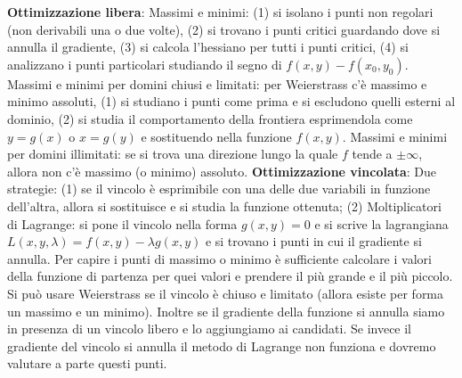 \documentclass[fontsize=8pt]{scrartcl}
\begin{document}
\begin{multicols*}{4}
\textbf{Ottimizzazione libera}:\newline
Massimi e minimi: (1) si isolano i punti non regolari (non derivabili una o due volte), (2) si trovano i punti critici guardando dove si annulla il gradiente, (3) si calcola l'hessiano per tutti i punti critici, (4) si analizzano i punti particolari studiando il segno di $f(x,y) - f(x_0, y_0)$.\newline
Massimi e minimi per domini chiusi e limitati: per Weierstrass c'è massimo e minimo assoluti, (1) si studiano i punti come prima e si escludono quelli esterni al dominio, (2) si studia il comportamento della frontiera esprimendola come $y = g(x)$ o $x = g(y)$ e sostituendo nella funzione $f(x,y)$.\newline
Massimi e minimi per domini illimitati: se si trova una direzione lungo la quale $f$ tende a $\pm \infty$, allora non c'è massimo (o minimo) assoluto.\newline
\textbf{Ottimizzazione vincolata}:\newline
Due strategie: \newline
(1) se il vincolo è esprimibile con una delle due variabili in funzione dell'altra, allora si sostituisce e si studia la funzione ottenuta; \newline
(2) Moltiplicatori di Lagrange: si pone il vincolo nella forma $g(x,y) = 0$ e si scrive la lagrangiana $L(x,y,\lambda) = f(x,y) - \lambda g(x,y)$ e si trovano i punti in cui il gradiente si annulla. Per capire i punti di massimo o minimo è sufficiente calcolare i valori della funzione di partenza per quei valori e prendere il più grande e il più piccolo. Si può usare Weierstrass se il vincolo è chiuso e limitato (allora esiste per forma un massimo e un minimo). Inoltre se il gradiente della funzione si annulla siamo in presenza di un vincolo libero e lo aggiungiamo ai candidati. Se invece il gradiente del vincolo si annulla il metodo di Lagrange non funziona e dovremo valutare a parte questi punti.

\end{multicols*}
\end{document}
